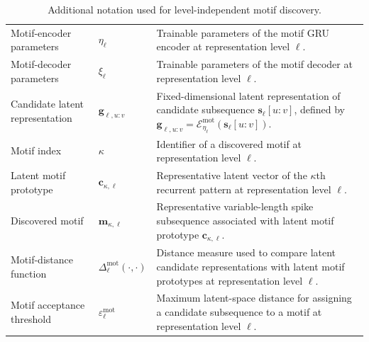 \documentclass[a4paper]{article}
\begin{document}
\begin{table}[H]
\begin{tabular}{p{} p{} p{}}
         Motif-encoder parameters
         & $\eta_{\ell}$
         & Trainable parameters of the motif GRU encoder at representation level $\ell$. \\

         Motif-decoder parameters
         & $\xi_{\ell}$
         & Trainable parameters of the motif decoder at representation level $\ell$. \\

         Candidate latent representation
         & $\mathbf{g}_{\ell,u:v}$
         & Fixed-dimensional latent representation of candidate subsequence $\mathbf{s}_{\ell}[u:v]$, defined by $\mathbf{g}_{\ell,u:v}=\mathcal{E}^{\mathrm{mot}}_{\eta_{\ell}}(\mathbf{s}_{\ell}[u:v])$. \\

         Motif index
         & $\kappa$
         & Identifier of a discovered motif at representation level $\ell$. \\

         Latent motif prototype
         & $\mathbf{c}_{\kappa,\ell}$
         & Representative latent vector of the $\kappa$th recurrent pattern at representation level $\ell$. \\

         Discovered motif
         & $\mathbf{m}_{\kappa,\ell}$
         & Representative variable-length spike subsequence associated with latent motif prototype $\mathbf{c}_{\kappa,\ell}$. \\

         Motif-distance function
         & $\Delta^{\mathrm{mot}}_{\ell}(\cdot,\cdot)$
         & Distance measure used to compare latent candidate representations with latent motif prototypes at representation level $\ell$. \\

         Motif acceptance threshold
         & $\varepsilon^{\mathrm{mot}}_{\ell}$
         & Maximum latent-space distance for assigning a candidate subsequence to a motif at representation level $\ell$. \\

         \hline
      \end{tabular}

      \caption{Additional notation used for level-independent motif discovery.}
      \label{tab:level-independent-motif-discovery-variables}
   \end{table}


   
   
\end{document}

